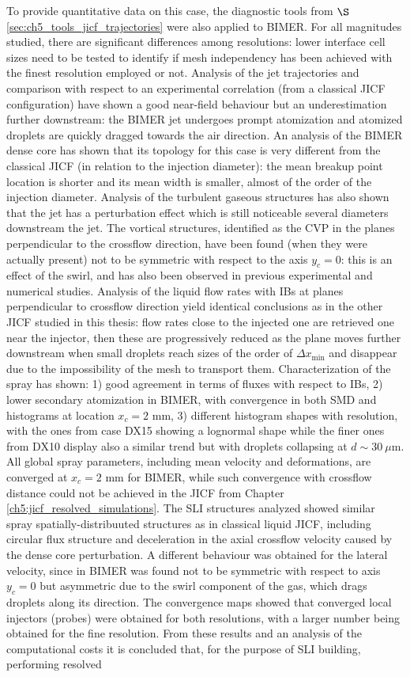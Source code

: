 To provide quantitative data on this case, the diagnostic tools from $\S$\ref{sec:ch5_tools_jicf_trajectories} were also applied to BIMER. For all magnitudes studied, there are significant differences among resolutions: lower interface cell sizes need to be tested to identify if mesh independency has been achieved with the finest resolution employed or not. Analysis of the jet trajectories and comparison with respect to an experimental correlation (from a classical JICF configuration) have shown a good near-field behaviour but an underestimation further downstream: the BIMER jet undergoes prompt atomization and atomized droplets are quickly dragged towards the air direction. An analysis of the BIMER dense core has shown that its topology for this case is very different from the classical JICF (in relation to the injection diameter): the mean breakup point location is shorter and its mean width is smaller, almost of the order of the injection diameter. Analysis of the turbulent gaseous structures has also shown that the jet has a perturbation effect which is still noticeable several diameters downstream the jet. The vortical structures, identified as the CVP in the planes perpendicular to the crossflow direction, have been found (when they were actually present) not to be symmetric with respect to the axis $y_c = 0$: this is an effect of the swirl, and has also been observed in previous experimental and numerical studies. Analysis of the liquid flow rates with IBs at planes perpendicular to crossflow direction yield identical conclusions as in the other JICF studied in this thesis: flow rates close to the injected one are retrieved one near the injector, then these are progressively reduced as the plane moves further downstream when small droplets reach sizes of the order of  $\Delta x_\mathrm{min}$ and disappear due to the impossibility of the mesh to transport them. Characterization of the spray has shown: 1) good agreement in terms of fluxes with respect to IBs, 2) lower secondary atomization in BIMER, with convergence in both SMD and histograms at location $x_c = 2$ mm, 3) different histogram shapes with resolution, with the ones from case DX15 showing a lognormal shape while the finer ones from DX10 display also a similar trend but with droplets collapsing at $d \sim 30~\mu$m. All global spray parameters, including mean velocity and deformations, are converged at $x_c = 2$ mm for BIMER, while such convergence with crossflow distance could not be achieved in the JICF from Chapter \ref{ch5:jicf_resolved_simulations}. The SLI structures analyzed showed similar spray spatially-distribuuted structures as in classical liquid JICF, including circular flux structure and deceleration in the axial crossflow velocity caused by the dense core perturbation. A different behaviour was obtained for the lateral velocity, since in BIMER was found not to be symmetric with respect to axis $y_c = 0$ but asymmetric due to the swirl component of the gas, which drags droplets along its direction. The convergence maps showed that converged local injectors (probes) were obtained for both resolutions, with a larger number being obtained for the fine resolution. From these results and an analysis of the computational costs it is concluded that, for the purpose of SLI building, performing resolved 